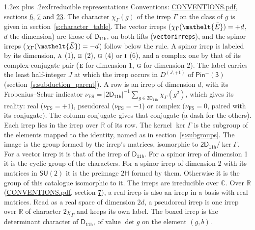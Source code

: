 \documentclass[10pt,a4paper]{article}
\makeatletter
\renewcommand\section{\@startsection{section}{1}{\z@}{-3ex plus -1ex minus -.2ex}%
  {1.2ex plus .2ex}{\normalfont\large\sffamily\bfseries\color{parttitle}}}
\numberwithin{equation}{section}
\newcommand{\eltfont}[1]{{\let\sigma\eltsigma\mathelt{#1}}}
\newcommand{\grp}[1]{\mathsf{#1}}
\newcommand{\irr}[1]{\text{\normalfont\scshape #1}}
\newcommand{\elt}[1]{\eltfont{#1}}
\newcommand{\irrJp}[2]{D^{(#1,#2)}}
\newcommand{\irchar}[1]{\chi_{#1}}
\newcommand{\fsind}{\nu_{\mathrm{FS}}}
\newcommand{\barred}[1]{\bar{#1}}
\makeatother
\begin{document}
\section{Irreducible representations}\label{s:irreps}
Conventions: \href{../../CONVENTIONS.pdf}{CONVENTIONS.pdf}, sections \href{../../../rotation/CONVENTIONS.pdf\#conv.6}{6}, \href{../../../rotation/CONVENTIONS.pdf\#conv.7}{7} and \href{../../CONVENTIONS.pdf\#conv.23}{23}.
\leavevmode\label{n:function.character}\label{n:irrep.Gamma}The character $\irchar{\Gamma}(g)$ of the irrep $\Gamma$ on the class of $g$ is given in section~\ref{s:character_table}. \label{n:index.dimension}The vector irreps ($\irchar{\Gamma}(\elt{\barred{E}}) = +d$, $d$ the dimension) are those of \href{../../../rotation/data/pdf/D11h.pdf}{$\grp{D_{11h}}$}, on both lifts (\texttt{vectorirreps}), and the spinor irreps ($\irchar{\Gamma}(\elt{\barred{E}}) = -d$) follow below the rule. A spinor irrep is labeled by its dimension, $\irr{a}$ (1), $\irr{e}$ (2), $\irr{g}$ (4) or $\irr{i}$ (6), and a complex one by that of its complex-conjugate pair ($\irr{e}$ for dimension 1, $\irr{g}$ for dimension 2). The label carries the least half-integer $J$ at which the irrep occurs in $\irrJp{J}{+1}$ of $\grp{Pin^{-}(3)}$ (section~\ref{s:subduction_parent}).
\leavevmode\label{n:index.frobenius}\label{n:head.irrep}\label{n:head.reality}A row is an irrep of dimension $d$, with its Frobenius--Schur indicator $\fsind = |\grp{2D_{11h}}|^{-1}\allowbreak\sum_{g\in\grp{2D_{11h}}}\irchar{\Gamma}(g^2)$, which gives its reality: real ($\fsind = +1$), pseudoreal ($\fsind = -1$) or complex ($\fsind = 0$, paired with its conjugate). \label{n:head.conjugate}The column conjugate gives that conjugate (a dash for the others). \label{n:head.over.real}Each irrep lies in the irrep over $\mathbb{R}$ of its row. \label{n:head.kernel}The kernel $\ker\Gamma$ is the subgroup of the elements mapped to the identity, named as in section~\ref{s:subgroups}. \label{n:head.image}The image is the group formed by the irrep's matrices, isomorphic to $\grp{2D_{11h}}/\ker\Gamma$. For a vector irrep it is that of the irrep of \href{../../../rotation/data/pdf/D11h.pdf}{$\grp{D_{11h}}$}. For a spinor irrep of dimension 1 it is the cyclic group of the characters. For a spinor irrep of dimension 2 with its matrices in $\grp{SU(2)}$ it is the preimage $\grp{2H}$ formed by them. Otherwise it is the group of this catalogue isomorphic to it. The irreps are irreducible over $\mathbb{C}$. Over $\mathbb{R}$ (\href{../../CONVENTIONS.pdf}{CONVENTIONS.pdf}, section \href{../../../rotation/CONVENTIONS.pdf\#conv.7}{7}), a real irrep is also an irrep in a basis with real matrices. Read as a real space of dimension $2d$, a pseudoreal irrep is one irrep over $\mathbb{R}$ of character $2\irchar{\Gamma}$ and keeps its own label. \label{n:mark.determinant}The boxed irrep is the determinant character of \href{../../../rotation/data/pdf/D11h.pdf}{$\grp{D_{11h}}$}, of value $\det g$ on the element $(g, b)$.
\end{document}

